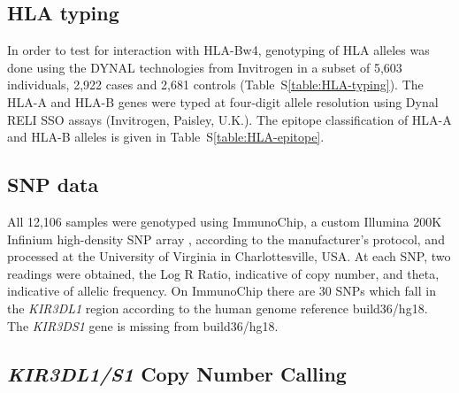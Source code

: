 \subsection*{HLA typing}

In order to test for interaction with HLA-Bw4,
genotyping of HLA alleles was done using the DYNAL technologies from Invitrogen in a subset of 5,603 individuals,  2,922 cases and 2,681 controls (Table~S\ref{table:HLA-typing}).
The HLA-A and HLA-B genes were typed at four-digit allele resolution using Dynal RELI SSO assays (Invitrogen, Paisley, U.K.).
The epitope classification of HLA-A and HLA-B alleles is given in Table~S\ref{table:HLA-epitope}.


\subsection{SNP data}

All 12,106 samples were genotyped using ImmunoChip, a custom Illumina 200K Infinium high-density SNP array \citep{immunochip},
according to the manufacturer's protocol, and processed at the University of Virginia in Charlottesville, USA.
At each SNP, two readings were obtained, the Log R Ratio, indicative of copy number, and theta, indicative of allelic frequency.
On ImmunoChip there are 30 SNPs which fall in the \emph{KIR3DL1} region according to the human genome reference build36/hg18.
The \emph{KIR3DS1} gene is missing from build36/hg18.



\subsection{\emph{KIR3DL1/S1} Copy Number Calling}

